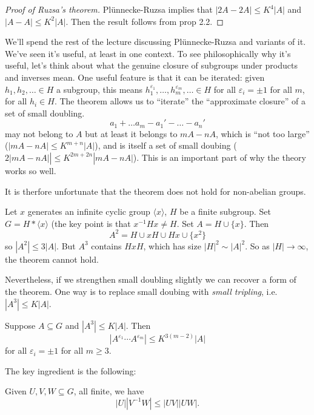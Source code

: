 \documentclass[a4paper]{article}
\begin{document}
\begin{proof}[Proof of Ruzsa's theorem]
  Plünnecke-Ruzsa implies that \(|2A - 2A| \leq K^4 |A|\) and \(|A - A| \leq K^2 |A|\). Then the result follows from prop 2.2.
\end{proof}

We'll spend the rest of the lecture discussing Plünnecke-Ruzsa and variants of it.
We've seen it's useful, at least in one context. To see philosophically why it's useful, let's think about what the genuine closure of subgroups under products and inverses mean. One useful feature is that it can be iterated: given \(h_1, h_2, \dots \in H\) a subgroup, this means \(h_1^{\varepsilon_1}, \dots, h_m^{\varepsilon_m}, \dots \in H\) for all \(\varepsilon_i = \pm 1\) for all \(m\), for all \(h_i \in H\). The theorem allows us to ``iterate'' the ``approximate closure'' of a set of small doubling.
\[
  a_1 + \dots a_m - a_1' - \dots - a_n'
\]
may not belong to \(A\) but at least it belongs to \(mA - nA\), which is ``not too large'' (\(|mA - nA| \leq K^{m + n} |A|\)), and is itself a set of small doubing (\(2|mA - nA|| \leq K^{2m + 2n} |mA - nA|\)). This is an important part of why the theory works so well.

It is therfore unfortunate that the theorem does not hold for non-abelian groups.

\begin{eg}
  Let \(x\) generates an infinite cyclic group \(\langle x \rangle\), \(H\) be a finite subgroup. Set \(G = H * \langle x \rangle\) (the key point is that \(x^{-1}Hx \neq H\). Set \(A = H \cup \{x\}\). Then
  \[
    A^2 = H \cup xH \cup Hx \cup \{x^2\}
  \]
  so \(|A^2| \leq 3 |A|\). But \(A^3\) contains \(HxH\), which has size \(|H|^2 \sim |A|^2\). So as \(|H| \to \infty\), the theorem cannot hold.
\end{eg}

Nevertheless, if we strengthen small doubling slightly we can recover a form of the theorem. One way is to replace small doubing with \emph{small tripling}, i.e.\ \(|A^3| \leq K |A|\).

\begin{proposition}[2.7]
  Suppose \(A \subseteq G\) and \(|A^3| \leq K |A|\). Then
  \[
    |A^{\varepsilon_1} \cdots A^{\varepsilon_m}| \leq K^{3(m - 2)} |A|
  \]
  for all \(\varepsilon_i = \pm 1\) for all \(m \geq 3\).
\end{proposition}

The key ingredient is the following:

\begin{lemma}
  Given \(U, V, W \subseteq G\), all finite, we have
  \[
    |U| |V^{-1} W| \leq |UV| |UW|.
  \]
\end{lemma}
\end{document}
